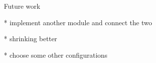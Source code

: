


Future work

* implement another module and connect the two

* shrinking better

* choose some other configurations
